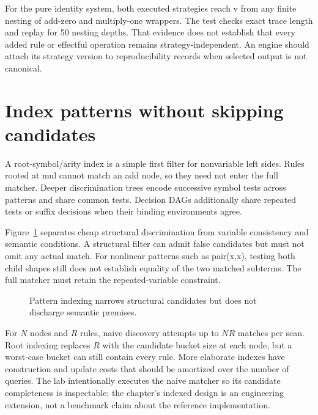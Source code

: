 For the pure identity system, both executed strategies reach v from any finite nesting of add-zero and multiply-one wrappers.
The test checks exact trace length and replay for 50 nesting depths.
That evidence does not establish that every added rule or effectful operation remains strategy-independent.
An engine should attach its strategy version to reproducibility records when selected output is not canonical.

\section{Index patterns without skipping candidates}
\label{sec:ch85-index}
A root-symbol/arity index is a simple first filter for nonvariable left sides.
Rules rooted at mul cannot match an add node, so they need not enter the full matcher.
Deeper discrimination trees encode successive symbol tests across patterns and share common tests.
Decision DAGs additionally share repeated tests or suffix decisions when their binding environments agree.

Figure~\ref{fig:ch85-dispatch} separates cheap structural discrimination from variable consistency and semantic conditions.
A structural filter can admit false candidates but must not omit any actual match.
For nonlinear patterns such as pair(x,x), testing both child shapes still does not establish equality of the two matched subterms.
The full matcher must retain the repeated-variable constraint.

\begin{figure}[htbp]
\centering
{}
\caption{Pattern indexing narrows structural candidates but does not discharge semantic premises.}
\label{fig:ch85-dispatch}
\end{figure}

For $N$ nodes and $R$ rules, naive discovery attempts up to $NR$ matches per scan.
Root indexing replaces $R$ with the candidate bucket size at each node, but a worst-case bucket can still contain every rule.
More elaborate indexes have construction and update costs that should be amortized over the number of queries.
The lab intentionally executes the naive matcher so its candidate completeness is inspectable; the chapter's indexed design is an engineering extension, not a benchmark claim about the reference implementation.

